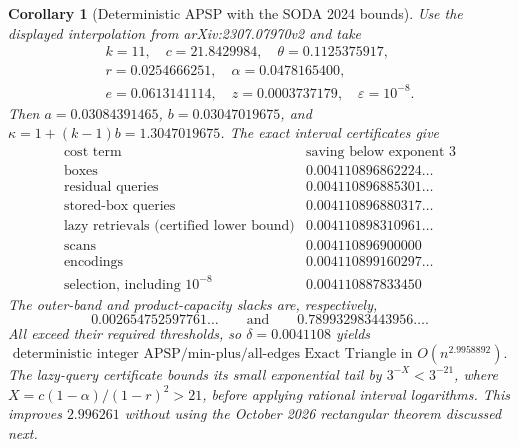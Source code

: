 \documentclass[11pt]{article}
\newtheorem{corollary}[theorem]{Corollary}
\begin{document}
\begin{corollary}[Deterministic APSP with the SODA 2024 bounds]
\label{cor:det-apsp-lazy}
Use the displayed interpolation from arXiv:2307.07970v2 and take
\begin{gather*}
k=11,\quad c=21.8429984,\quad\theta=0.1125375917,\\
r=0.0254666251,\quad\alpha=0.0478165400,\\
e=0.0613141114,\quad z=0.0003737179,\quad\varepsilon=10^{-8}.
\end{gather*}
Then $a=0.03084391465$, $b=0.03047019675$, and
$\kappa=1+(k-1)b=1.3047019675$. The exact interval certificates give
\[
\begin{array}{lr}
\text{cost term}&\text{saving below exponent }3\\
\hline
\text{boxes}&0.004110896862224\ldots\\
\text{residual queries}&0.004110896885301\ldots\\
\text{stored-box queries}&0.004110896880317\ldots\\
\text{lazy retrievals (certified lower bound)}&0.004110898310961\ldots\\
\text{scans}&0.004110896900000\\
\text{encodings}&0.004110899160297\ldots\\
\text{selection, including }10^{-8}&0.004110887833450
\end{array}
\]
The outer-band and product-capacity slacks are, respectively,
\[
0.002654752597761\ldots\qquad\text{and}\qquad0.789932983443956\ldots.
\]
All exceed their required thresholds, so $\delta=0.0041108$ yields
\[
\boxed{\text{deterministic integer APSP/min-plus/all-edges Exact Triangle
in }O(n^{2.9958892}).}
\]
The lazy-query certificate bounds its small exponential tail by
$3^{-X}<3^{-21}$, where $X=c(1-\alpha)/(1-r)^2>21$, before applying
rational interval logarithms. This improves $2.996261$ without using the
October 2026 rectangular theorem discussed next.
\end{corollary}
\end{document}
